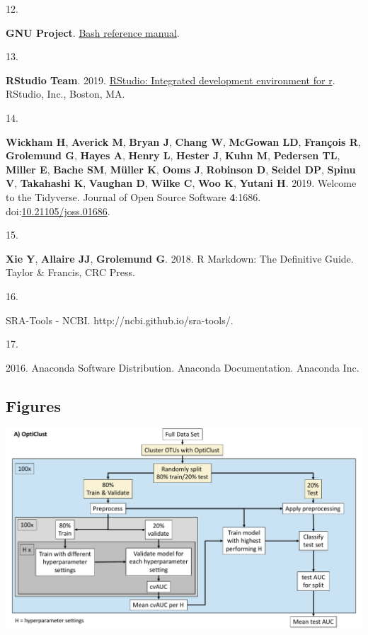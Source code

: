 \documentclass[
]{article}
\newlength{\cslhangindent}
\newlength{\csllabelwidth}
\newlength{\cslentryspacingunit} %
\newenvironment{CSLReferences}[2] %
 {%
  \setlength{\parindent}{0pt}
  \ifodd #1
  \let\oldpar\par
  \def\par{\hangindent=\cslhangindent\oldpar}
  \fi
  \setlength{\parskip}{#2\cslentryspacingunit}
 }%
 {}
\newcommand{\CSLLeftMargin}[1]{\parbox[t]{\csllabelwidth}{#1}}
\newcommand{\CSLRightInline}[1]{\parbox[t]{\linewidth - \csllabelwidth}{#1}\break}
\begin{document}
\begin{CSLReferences}{0}{1}
\leavevmode{}%
\CSLLeftMargin{12. }
\CSLRightInline{\textbf{GNU Project}.
\href{https://www.gnu.org/software/bash/\%20manual/bash.html/}{Bash
reference manual}.}

\leavevmode{}%
\CSLLeftMargin{13. }
\CSLRightInline{\textbf{RStudio Team}. 2019.
\href{http://www.rstudio.com/}{RStudio: Integrated development
environment for r}. RStudio, Inc., Boston, MA.}

\leavevmode{}%
\CSLLeftMargin{14. }
\CSLRightInline{\textbf{Wickham H}, \textbf{Averick M}, \textbf{Bryan
J}, \textbf{Chang W}, \textbf{McGowan LD}, \textbf{François R},
\textbf{Grolemund G}, \textbf{Hayes A}, \textbf{Henry L}, \textbf{Hester
J}, \textbf{Kuhn M}, \textbf{Pedersen TL}, \textbf{Miller E},
\textbf{Bache SM}, \textbf{Müller K}, \textbf{Ooms J}, \textbf{Robinson
D}, \textbf{Seidel DP}, \textbf{Spinu V}, \textbf{Takahashi K},
\textbf{Vaughan D}, \textbf{Wilke C}, \textbf{Woo K}, \textbf{Yutani H}.
2019. Welcome to the Tidyverse. Journal of Open Source Software
\textbf{4}:1686.
doi:\href{https://doi.org/10.21105/joss.01686}{10.21105/joss.01686}.}

\leavevmode{}%
\CSLLeftMargin{15. }
\CSLRightInline{\textbf{Xie Y}, \textbf{Allaire JJ}, \textbf{Grolemund
G}. 2018. R {Markdown}: {The Definitive Guide}. {Taylor \& Francis, CRC
Press}.}

\leavevmode{}%
\CSLLeftMargin{16. }
\CSLRightInline{{SRA}-{Tools} - {NCBI}.
http://ncbi.github.io/sra-tools/.}

\leavevmode{}%
\CSLLeftMargin{17. }
\CSLRightInline{2016. Anaconda {Software Distribution}. Anaconda
Documentation. Anaconda Inc.}

\end{CSLReferences}

\setlength{\parindent}{0in}
\setlength{\leftskip}{0in}

\newpage

\hypertarget{figures}{%
\subsection{Figures}\label{figures}}

\includegraphics{../exploratory/figures/figure1_a.pdf}
\end{document}

